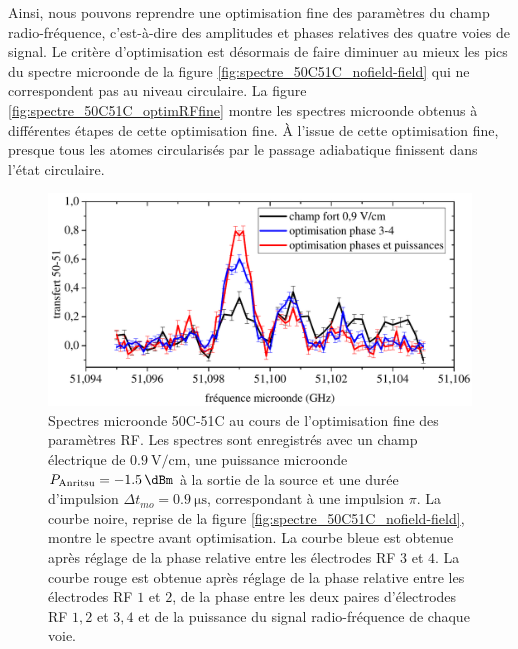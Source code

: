 Ainsi, nous pouvons reprendre une optimisation fine des paramètres du champ radio-fréquence, c'est-à-dire des amplitudes et phases relatives des quatre voies de signal.
Le critère d'optimisation est désormais de faire diminuer au mieux les pics du spectre microonde de la figure \eqref{fig:spectre_50C51C_nofield-field} qui ne correspondent pas au niveau circulaire.
La figure \eqref{fig:spectre_50C51C_optimRFfine} montre les spectres microonde obtenus à différentes étapes de cette optimisation fine.
\`A l'issue de cette optimisation fine, presque tous les atomes circularisés par le passage adiabatique finissent dans l'état circulaire.
%
\begin{figure}[!h]
\centering
\includegraphics[width=.85\linewidth]{figures/circulars/spectre_50C51C_optimRFfine}
\caption[Spectres microonde 50C-51C au cours de l'optimisation fine des paramètres RF]{
Spectres microonde 50C-51C au cours de l'optimisation fine des paramètres RF.
Les spectres sont enregistrés avec un champ électrique de $\SI{0.9}{\V/\cm}$, une puissance microonde $P_{\text{Anritsu}} = \SI{-1.5}{\dBm}$ à la sortie de la source et une durée d'impulsion $\Delta t _{mo} = \SI{0.9}{\us}$, correspondant à une impulsion $\pi$.
La courbe noire, reprise de la figure \eqref{fig:spectre_50C51C_nofield-field}, montre le spectre avant optimisation.
La courbe bleue est obtenue après réglage de la phase relative entre les électrodes RF $3$ et $4$.
La courbe rouge est obtenue après réglage de la phase relative entre les électrodes RF $1$ et $2$, de la phase entre les deux paires d'électrodes RF $1,2$ et $3,4$ et de la puissance du signal radio-fréquence de chaque voie.
}
\label{fig:spectre_50C51C_optimRFfine}
\end{figure}
%



